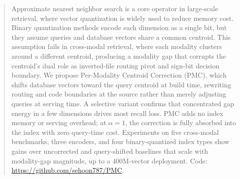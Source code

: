 \begin{abstract}
Approximate nearest neighbor search is a core operator in large-scale retrieval, where vector quantization is widely used to reduce memory cost. Binary quantization methods encode each dimension as a single bit, but they assume queries and database vectors share a common centroid. This assumption fails in cross-modal retrieval, where each modality clusters around a different centroid, producing a modality gap that corrupts the centroid's dual role as inverted-file routing pivot and sign-bit decision boundary. We propose Per-Modality Centroid Correction (PMC), which shifts database vectors toward the query centroid at build time, rewriting routing and code boundaries at the source rather than merely adjusting queries at serving time. A selective variant confirms that concentrated gap energy in a few dimensions drives most recall loss. PMC adds no index memory or serving overhead; at $\alpha{=}1$, the correction is fully absorbed into the index with zero query-time cost. Experiments on five cross-modal benchmarks, three encoders, and four binary-quantized index types show gains over uncorrected and query-shifted baselines that scale with modality-gap magnitude, up to a 400M-vector deployment. Code: \url{https://github.com/sehoon787/PMC}.
\end{abstract}

